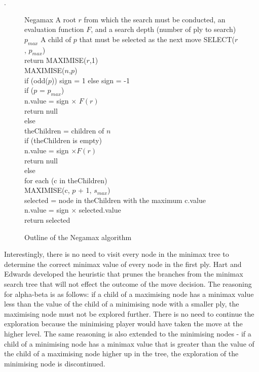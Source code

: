 .
\begin{figure} [t]
\begin{algorithm} 
{Negamax}
{A root $r$ from which the search must be conducted, an evaluation function $F$, and a search depth (number of ply to search) $p_{max}$}
{A child of $p$ that must be selected as the next move} 
SELECT($r$, $p_{max}$)  \+\\
	return MAXIMISE($r$,1) \-\\

MAXIMISE($n$,$p$) \+\\
	if (odd($p$)) sign = 1 else sign = -1 \\
	if ($p$ = $p_{max}$) \+\\
	  n.value = sign $\times$ $F(r)$ \\
		return null \-\\
	else \+\\	
		theChildren = children of $n$ \\
		if (theChildren is empty) \+\\
			n.value = sign $ \times F(r)$ \\
			return null \-\\
		else \+\\			
			for each (c in theChildren) \+\\
				MAXIMISE(c, $p$ + 1, $s_{max}$) \-\\ 
			selected = node in theChildren with the maximum c.value \\
			n.value = sign $\times$ selected.value \\
			return selected \-\-\\
\end{algorithm}
\caption{Outline of the Negamax algorithm}	
\label{alg:negamax}
\end{figure}


Interestingly, there is no need to visit every node in the minimax tree to determine the correct minimax value of every node in the first ply.  Hart and Edwards \cite{hart:alpha} developed the  heuristic that prunes the branches from the minimax search tree that will not effect the outcome of the move decision.  The reasoning for alpha-beta is as follows: if a child of a maximising node has a minimax value less than the value of the child of a minimising node with a smaller ply, the maximising node must not be explored further.  There is no need to continue the exploration because the minimising player would have taken the move at the higher level.  The same reasoning is also extended to the minimising nodes - if a child of a minimising node has a minimax value that is greater than the value of the child of a maximising node higher up in the tree, the exploration of the minimising node is discontinued.     

